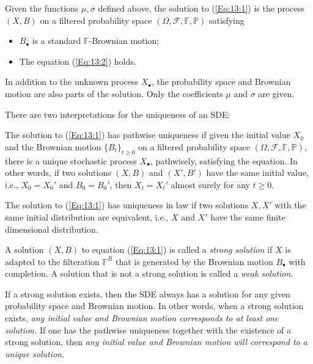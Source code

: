 \begin{definition}
Given the functions $\mu,\sigma$ defined above, the solution to (\eqref{Eq:13:1}) is the process $(X,B)$ on a filtered probability space $(\Omega,\mathcal{F},\mathbb{F},\mathbb{P})$ satisfying
\begin{itemize}
\item
$B_{\bullet}$ is a standard $\mathbb{F}$-Brownian motion;
\item
The equation (\ref{Eq:13:2}) holds.
\end{itemize}
\end{definition}
\begin{remark}
In addition to the unknown process $X_{\bullet}$, the probability space and Brownian motion are also parts of the solution. Only the coefficients $\mu$ and $\sigma$ are given.
\end{remark}

There are two interpretations for the uniqueness of an SDE:
\begin{definition}
The solution to (\eqref{Eq:13:1}) has pathwise uniqueness if given the initial value $X_0$ and the Brownian motion $\{B_t\}_{t\ge0}$ on a filtered probability space $(\Omega,\mathcal{F},\mathbb{F},\mathbb{P})$, there is a unique stochastic process $X_{\bullet}$, pathwisely, satisfying the equation.
In other words, if two solutions $(X,B)$ and $(X',B')$ have the same initial value, i.e., $X_0=X_0'$ and $B_0=B_0'$, then $X_t=X_t'$ almost surely for any $t\ge0$.
\end{definition}

\begin{definition}
The solution to (\eqref{Eq:13:1}) has uniqueness in law if two solutions $X,X'$ with the same initial distribution are equivalent, i.e., $X$ and $X'$ have the same finite dimensional distribution.
\end{definition}

\begin{definition}
A solution $(X,B)$ to equation (\ref{Eq:13:1}) is called a \emph{strong solution} if $X$ is adapted to the filteration $\mathbb{F}^B$ that is generated by the Brownian motion $B_{\bullet}$ with completion.
A solution that is not a strong solution is called a \emph{weak solution}.
\end{definition}

\begin{remark}
If a strong solution exists, then the SDE always has a solution for any given probability space and Brownian motion.
In other words, when a strong solution exists, {\it any initial value and Brownian motion corresponds to at least one solution.}
If one has the pathwise uniqueness together with the existence of a strong solution, then {\it any initial value and Brownian motion will correspond to a unique solution.}
\end{remark}

